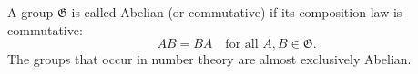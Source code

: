 A group $\mathfrak{G}$ is called Abelian (or commutative) if its composition law is commutative:
$$AB = BA \quad \text{for all } A, B \in \mathfrak{G}.$$
The groups that occur in number theory are almost exclusively Abelian.
